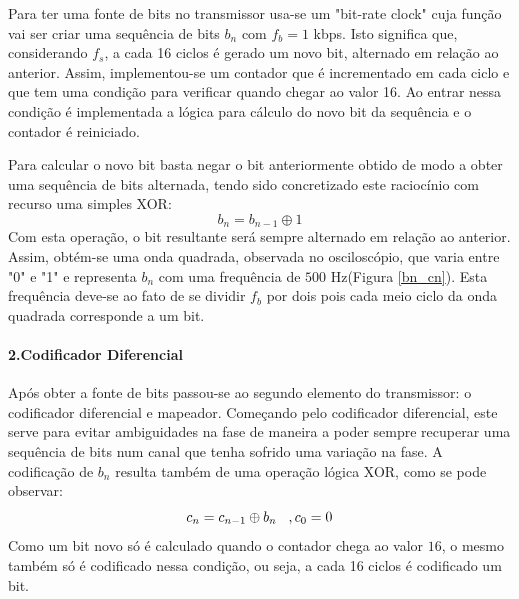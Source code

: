\documentclass[11pt]{article}
\numberwithin{equation}{section}
\begin{document}
Para ter uma fonte de bits no transmissor usa-se um "bit-rate clock" cuja função vai ser criar uma sequência de bits $ b_n $ com $f_b=1$ kbps. Isto significa que, considerando $f_s$, a cada 16 ciclos é gerado um novo bit, alternado em relação ao anterior. Assim, implementou-se um contador que é incrementado em cada ciclo  e que tem uma condição para verificar quando chegar ao valor 16. Ao entrar nessa condição é implementada a lógica para cálculo do novo bit da sequência e o contador é reiniciado.

Para calcular o novo bit basta negar o bit anteriormente obtido de modo a obter uma sequência de bits alternada, tendo sido concretizado este raciocínio com recurso uma simples XOR:
\begin{equation}
b_n=b_{n-1} \oplus 1
\end{equation}
Com esta operação, o bit resultante será sempre alternado em relação ao anterior.
Assim, obtém-se uma onda quadrada, observada no osciloscópio, que varia entre "0" e "1" e representa $ b_n $  com uma frequência de $500$ Hz(Figura \ref{bn_cn}). Esta frequência deve-se ao fato de se dividir  $f_b$ por dois pois cada meio ciclo da onda quadrada corresponde a um bit.  

\paragraph{2.Codificador Diferencial} \hspace{0pt}

Após obter a fonte de bits passou-se ao segundo elemento do transmissor: o codificador diferencial e mapeador. Começando pelo codificador diferencial, este serve para evitar ambiguidades na fase de maneira a poder sempre recuperar uma sequência de bits num canal que tenha sofrido uma variação na fase.
A codificação de $b_n$ resulta também de uma operação lógica XOR, como se pode observar: 
\begin{equation}
c_n=c_{n-1} \oplus b_n \hspace{3 mm} ,c_0=0
\end{equation}
Como um bit novo só é calculado quando o contador chega ao valor $16$, o mesmo também só é codificado nessa condição, ou seja, a cada 16 ciclos é codificado um bit. 
\end{document}
